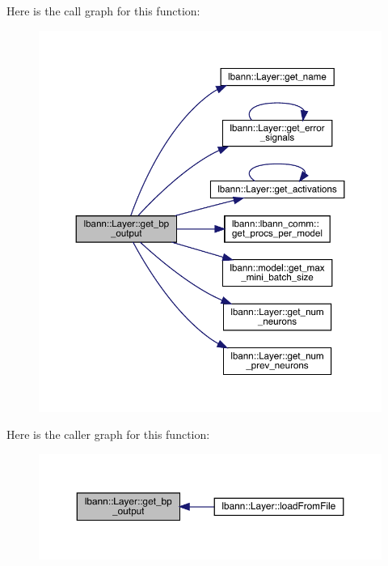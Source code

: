 Here is the call graph for this function\+:\nopagebreak
\begin{figure}[H]
\begin{center}
\leavevmode
\includegraphics[width=350pt]{classlbann_1_1Layer_a81f9f4fc956daf4838a7ed248427b1f3_cgraph}
\end{center}
\end{figure}
Here is the caller graph for this function\+:\nopagebreak
\begin{figure}[H]
\begin{center}
\leavevmode
\includegraphics[width=350pt]{classlbann_1_1Layer_a81f9f4fc956daf4838a7ed248427b1f3_icgraph}
\end{center}
\end{figure}
\mbox{\label{classlbann_1_1Layer_aa0058c8ec4913efc3e4de5d6f61eb8db}} 
